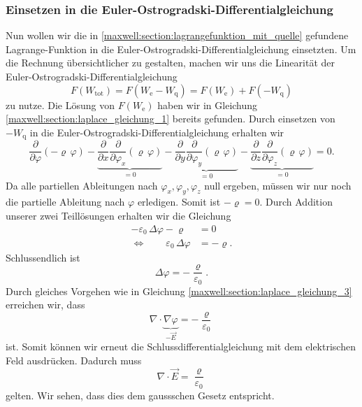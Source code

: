 \subsubsection{Einsetzen in die Euler-Ostrogradski-Differentialgleichung}
Nun wollen wir die in \eqref{maxwell:section:lagrangefunktion_mit_quelle} gefundene Lagrange-Funktion in die Euler-Ostrogradski-Differentialgleichung einsetzten.
Um die Rechnung übersichtlicher zu gestalten, machen wir uns die Linearität der Euler-Ostrogradski-Differentialgleichung
\begin{equation}
F(W_{\text{tot}})
=
F(W_{\text{e}} - W_{\text{q}})
=
F(W_{\text{e}}) + F(-W_{\text{q}})
\label{maxwell:section:linearität_von_DGL}
\end{equation}
zu nutze.
Die Lösung von $F(W_{\text{e}})$ haben wir in Gleichung \eqref{maxwell:section:laplace_gleichung_1} bereits gefunden.
Durch einsetzen von $-W_{\text{q}}$ in die Euler-Ostrogradski-Differentialgleichung erhalten wir
\[
\frac{\partial}{\partial\varphi}\left(-\varrho\,\varphi\right) - \underbrace{\frac{\partial}{\partial x}\frac{\partial}{\partial\varphi_x}\left(\varrho\,\varphi\right)}_{=0} - \underbrace{\frac{\partial}{\partial y}\frac{\partial}{\partial\varphi_y}\left(\varrho\,\varphi\right)}_{=0} - \underbrace{\frac{\partial}{\partial z}\frac{\partial}{\partial\varphi_z}\left(\varrho\,\varphi\right)}_{=0}
=
0.
\]
Da alle partiellen Ableitungen nach $\varphi_x, \varphi_y, \varphi_z$ null ergeben, müssen wir nur noch die partielle Ableitung nach $\varphi$ erledigen.
Somit ist
\(
-\varrho
=
0.
\)
Durch Addition unserer zwei Teillösungen erhalten wir die Gleichung
\begin{align*}
-\varepsilon_0\,\Delta\varphi - \varrho
&=
0
\\
\Leftrightarrow \qquad \varepsilon_0\,\Delta\varphi
&=
-\varrho.
\end{align*}
Schlussendlich ist
\begin{equation}
\Delta\varphi
=
-\frac{\varrho}{\varepsilon_0}.
\label{maxwell:section:erste_maxwellgleichung_1}
\end{equation}
Durch gleiches Vorgehen wie in Gleichung \eqref{maxwell:section:laplace_gleichung_3} erreichen wir, dass
\[
\nabla\cdot\underbrace{\nabla\varphi}_{\displaystyle-\vec{E}}
=
-\frac{\varrho}{\varepsilon_0}
\]
ist.
Somit können wir erneut die Schlussdifferentialgleichung mit dem elektrischen Feld ausdrücken.
Dadurch muss
\begin{equation}
\nabla\cdot\vec{E}
=
\frac{\varrho}{\varepsilon_0}
\label{maxwell:section:erste_maxwellgleichung_2}
\end{equation}
gelten.
Wir sehen, dass dies dem gaussschen Gesetz entspricht.

